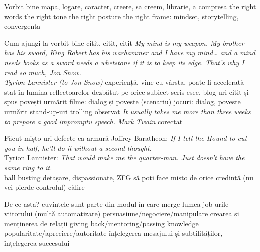 \documentclass{beamer}
\begin{document}
\begin{frame}{Vorbit bine}
mapa, logare, caracter, creere, sa creem, librarie, a compresa
the right words
the right tone
the right posture
the right frame: mindset, storytelling, convergenta
\end{frame}

\begin{frame}{Cum ajungi la vorbit bine}
  citit, citit, citit
  \centering
  \textit{My mind is my weapon. My brother has his sword, King Robert has his warhammer and I have my mind\ldots{} and a mind needs books as a sword needs a whetstone if it is to keep its edge. That's why I read so much, Jon Snow.}\\
  \vspace{3mm}
  \hfill \textit{Tyrion Lannister (to Jon Snow)}
  experiență, vine cu vârsta, poate fi accelerată
  stat în lumina reflectoarelor
  dezbătut pe orice subiect
  scris esee, blog-uri
  citit și spus povești
  urmărit filme: dialog și poveste (scenariu)
  jocuri: dialog, poveste
  urmărit stand-up-uri
  trolling
  observat
  \centering
  \textit{It usually takes me more than three weeks to prepare a good impromptu speech.}
  \vspace{3mm}
  \hfill \textit{Mark Twain}
  corectat
\end{frame}

\begin{frame}{Făcut mișto-uri}
  defecte ca armură
  Joffrey Baratheon: \textit{If I tell the Hound to cut you in half, he'll do it without a second thought.}\\
  Tyrion Lannister: \textit{That would make me the quarter-man. Just doesn't have the same ring to it.}\\
  ball busting
  detașare, dispassionate, ZFG
  să poți face mișto de orice credință (nu vei pierde controlul)
  călire
\end{frame}

\begin{frame}{De ce asta?}
  cuvintele sunt parte din modul în care merge lumea
  job-urile viitorului (multă automatizare)
  persuasiune/negociere/manipulare
  crearea și menținerea de relații
  giving back/mentoring/passing knowledge
  popularitate/apreciere/autoritate
  înțelegerea mesajului și subtilităților, înțelegerea succesului
\end{frame}
\end{document}
